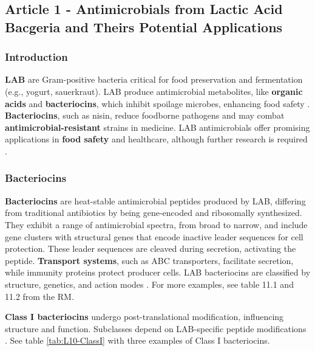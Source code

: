\subsection{Article 1 - Antimicrobials from Lactic Acid Bacgeria and Theirs Potential Applications}
\subsubsection*{Introduction}
\textbf{LAB} are Gram-positive bacteria critical for food preservation and fermentation (e.g., yogurt, sauerkraut). LAB produce antimicrobial metabolites, like \textbf{organic acids} and \textbf{bacteriocins}, which inhibit spoilage microbes, enhancing food safety \cite*{L10-MicroFunct}. \textbf{Bacteriocins}, such as nisin, reduce foodborne pathogens and may combat \textbf{antimicrobial-resistant} strains in medicine. LAB antimicrobials offer promising applications in \textbf{food safety} and healthcare, although further research is required \cite*{L10-MicroFunct}.

\subsubsection{Bacteriocins}
\textbf{Bacteriocins} are heat-stable antimicrobial peptides produced by LAB, differing from traditional antibiotics by being gene-encoded and ribosomally synthesized. They exhibit a range of antimicrobial spectra, from broad to narrow, and include gene clusters with structural genes that encode inactive leader sequences for cell protection. These leader sequences are cleaved during secretion, activating the peptide. \textbf{Transport systems}, such as ABC transporters, facilitate secretion, while immunity proteins protect producer cells. LAB bacteriocins are classified by structure, genetics, and action modes \cite*{L10-MicroFunct}. For more examples, see table 11.1 and 11.2 from the RM.

\textbf{Class I bacteriocins} undergo post-translational modification, influencing structure and function. Subclasses depend on LAB-specific peptide modifications \cite*{L10-MicroFunct}. See table \ref*{tab:L10-ClassI} with three examples of Class I bacteriocins.

